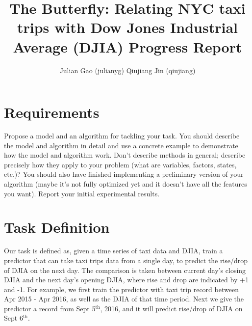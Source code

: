 \documentclass[a4paper]{article}
\title{The Butterfly: Relating NYC taxi trips with Dow Jones Industrial Average (DJIA) Progress Report}
\author{Julian Gao (julianyg) Qiujiang Jin (qiujiang)}
\begin{document}
\maketitle
\section{Requirements}
Propose a model and an algorithm for tackling your task. You should describe the model and algorithm in detail and use a concrete example to demonstrate how the model and algorithm work. Don't describe methods in general; describe precisely how they apply to your problem (what are variables, factors, states, etc.)? You should also have finished implementing a preliminary version of your algorithm (maybe it's not fully optimized yet and it doesn't have all the features you want). Report your initial experimental results.
\section{Task Definition}
Our task is defined as, given a time series of taxi data and DJIA, train a predictor that can take taxi trips data from a single day, to predict the rise/drop of DJIA on the next day. The comparison is taken between current day's closing DJIA and the next day's opening DJIA, where rise and drop are indicated by +1 and -1. For example, we first train the predictor with taxi trip record between Apr 2015 - Apr 2016, as well as the DJIA of that time period. Next we give the predictor a record from Sept 5$^{\text{th}}$, 2016, and it will predict rise/drop of DJIA on Sept 6$^{\text{th}}$.
\end{document}
